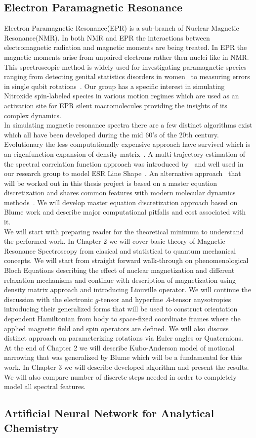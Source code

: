 \subsection{Electron Paramagnetic Resonance} 
Electron Paramagnetic Resonance(EPR) is a sub-branch of Nuclear Magnetic Resonance(NMR). In both NMR and EPR the interactions between electromagnetic radiation and magnetic moments are being treated. In EPR the magnetic moments arise from unpaired electrons rather then nuclei like in NMR. This spectroscopic method is widely used for investigating paramagnetic species ranging from detecting genital statistics disorders in women~\cite{2014arXiv1405.1230S} to measuring errors in single qubit rotations~\cite{2016arXiv161101110L}. Our group has a specific interest in simulating Nitroxide spin-labeled species in various motion regimes which are used as an activation site for EPR silent macromolecules providing the insights of its complex dynamics. \\ In simulating magnetic resonance spectra there are a few distinct algorithms exist which all have been developed during the mid 60's of the 20th century. Evolutionary the less computationally expensive approach have survived which is an eigenfunction expansion of density matrix~\cite{freed}. A multi‐trajectory estimation of	the spectral correlation function approach was introduced by~\cite{pedersen} and well used in our research group to model ESR Line Shape~\cite{mat_thesis}. An alternative approach~\cite{blume} that will be worked out in this thesis project is based on a master equation discretization and shares common features with modern molecular dynamics methods~\cite{sezer}. We will develop master equation discretization approach based on Blume work and describe major computational pitfalls and cost associated with it. 
\\
We will start with preparing reader for the theoretical minimum to understand the performed work. In Chapter 2 we will cover basic theory of Magnetic Resonance Spectroscopy from clasical  and statistical to quantum mechanical concepts. We will start from straight forward walk-through on phenomenological Bloch Equations describing the effect of nuclear magnetization and different relaxation mechanisms and continue with description of magnetization using density matrix approach and introducing Liouville operator.  
We will continue the discussion with the electronic $g$-tensor and hyperfine $A$-tensor anysotropies introducing their generalized forms that will be used to construct orientation dependent Hamiltonian from body to space-fixed coordinate frames where the applied magnetic field and spin operators are defined. We will also discuss distinct approach on parameterizing rotations via Euler angles or Quaternions. At the end of Chapter 2 we will describe Kubo-Anderson model\cite{kubo}\cite{anderson} of motional narrowing that was generalized by Blume which will be a fundamental for this work. In Chapter 3 we will describe developed algorithm and present the results. We will also compare number of discrete steps needed in order to completely model all spectral features.       
\subsection{Artificial Neural Network for Analytical Chemistry}
